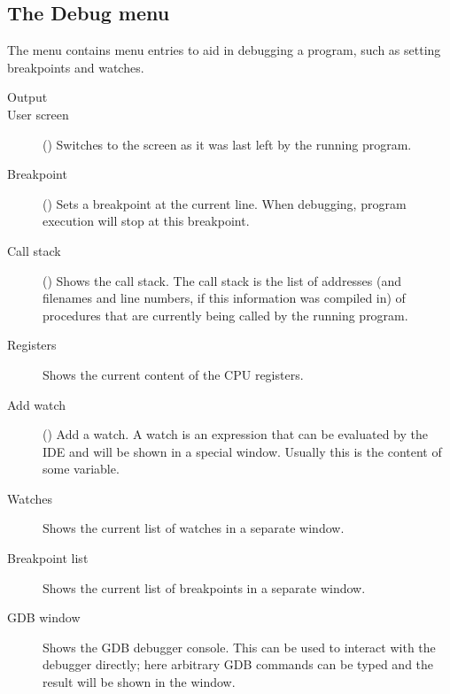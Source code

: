 \subsection{The Debug menu}
\label{se:menudebug}
The  menu contains menu entries to aid in debugging a program, such as
setting breakpoints and watches. 
\begin{description}
\item[Output]
\item[User screen] ()
Switches to the screen as it was last left by the running program.
\item[Breakpoint] ()
Sets a breakpoint at the current line. When debugging, program execution
will stop at this breakpoint.
\item[Call stack] ()
Shows the call stack. The call stack is the list of addresses (and
filenames and line numbers, if this information was compiled in) of 
procedures that are currently being called by the running program.
\item[Registers]
Shows the current content of the CPU registers. 
\item[Add watch] () Add a watch. A watch is an expression
that can be evaluated by the IDE and will be shown in a special window. 
Usually this is the content of some variable. 
\item[Watches]
Shows the current list of watches in a separate window.
\item[Breakpoint list]
Shows the current list of breakpoints in a separate window.
\item[GDB window]
Shows the GDB debugger console. This can be used to interact with the debugger
directly; here arbitrary GDB commands can be typed and the result will be
shown in the window.
\end{description}
%
%

